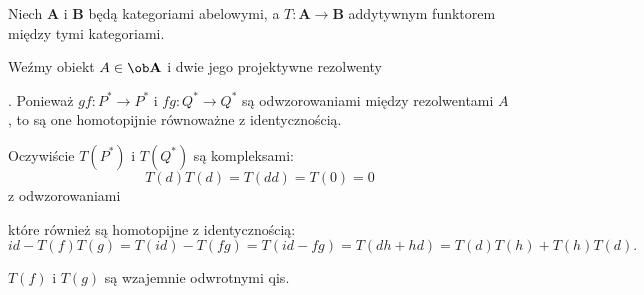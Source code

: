 \begin{example}
\item Niech $\mathbf{A}$ i $\mathbf{B}$ będą kategoriami abelowymi, a $T:\mathbf{A}\to \mathbf{B}$ addytywnym funktorem między tymi kategoriami.

  Weźmy obiekt $A\in\ob\mathbf{A}$ i dwie jego projektywne rezolwenty . Ponieważ $gf:P^*\to P^*$ i $fg:Q^*\to Q^*$ są odwzorowaniami między rezolwentami $A$, to są one homotopijnie równoważne z identycznością.
  
  Oczywiście $T(P^*)$ i $T(Q^*)$ są kompleksami:
  $$T(d)T(d)=T(dd)=T(0)=0$$
  z odwzorowaniami  które również są homotopijne z identycznością:
  $$id-T(f)T(g)=T(id)-T(fg)=T(id-fg)=T(dh+hd)=T(d)T(h)+T(h)T(d).$$
  
  \begin{conclusion}
    $T(f)$ i $T(g)$ są wzajemnie odwrotnymi qis.
  \end{conclusion}
\end{example}

